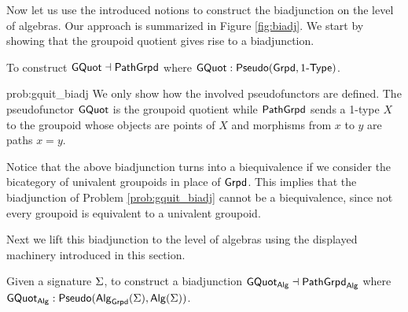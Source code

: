 Now let us use the introduced notions to construct the biadjunction on the level of algebras.
Our approach is summarized in Figure \ref{fig:biadj}.
We start by showing that the groupoid quotient gives rise to a biadjunction.

\begin{problem}
\label{prob:gquit_biadj}
To construct $\mathsf{GQuot} \dashv \mathsf{PathGrpd}$ where $\mathsf{GQuot} : \mathsf{Pseudo}(\mathsf{Grpd}, 1\mbox{-}\mathsf{Type})$.
\end{problem}

\begin{construction}{prob:gquit_biadj}
\label{constr:gquit_biadj}
We only show how the involved pseudofunctors are defined.
The pseudofunctor $\mathsf{GQuot}$ is the groupoid quotient
while $\mathsf{PathGrpd}$ sends a 1-type $X$ to the groupoid whose objects are points of $X$ and morphisms from $x$ to $y$ are paths $x = y$.
\end{construction}
Notice that the above biadjunction turns into a biequivalence if we consider the bicategory of univalent groupoids in place of $\mathsf{Grpd}$. This implies that the biadjunction of Problem \ref{prob:gquit_biadj} cannot be a biequivalence, since not every groupoid is equivalent to a univalent groupoid.

Next we lift this biadjunction to the level of algebras using the displayed machinery introduced in this section.

\begin{problem}
\label{prob:alg_biadj}
Given a signature $\Sigma$, to construct a biadjunction $\mathsf{GQuot}_{\mathsf{Alg}} \dashv \mathsf{PathGrpd}_{\mathsf{Alg}}$ where $\mathsf{GQuot}_{\mathsf{Alg}} : \mathsf{Pseudo}(\mathsf{Alg}_{\mathsf{Grpd}}(\Sigma), \mathsf{Alg}(\Sigma))$.
\end{problem}


